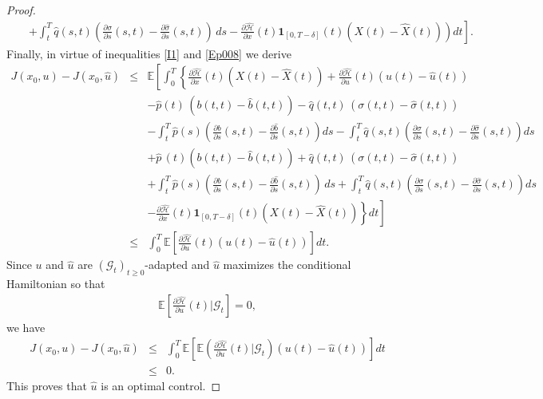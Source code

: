 \documentclass[12pt]{article}
\theoremstyle{remark}
\numberwithin{equation}{section}
\def\E{\mathbb E}
\def\E{\mathbb E}
\begin{document}
\begin{proof}
\begin{eqnarray}
	&&\left.\left.+ \int_t^T \hat{q}(s,t)\left( \frac{\partial \sigma}{\partial s}(s,t)- \frac{\partial \hat{\sigma}}{\partial s}(s,t)\right) \, ds -\frac{\partial \hat{\mathcal{H}}}{\partial x}(t)\mathbf{1}_{[0,T-\delta]}(t) \left(X(t)-\hat{X}(t)\right) 
	\right)dt\right].
\end{eqnarray}
Finally, in virtue of inequalities \eqref{I1} and \eqref{Ep008} we derive
\begin{eqnarray*}
J(x_0,u)-J(x_0,\hat{u}) &\leq &\mathbb{E}\left[\int_0^T\left\{\frac{\partial \hat{\mathcal{H}}}{\partial x}(t) \left(X(t) - \hat{X}(t)\right)+  \frac{\partial \hat{\mathcal{H}}}{\partial u}(t)(u(t) - \hat{u}(t))\right.\right.\\
	&&\left.\left.- \hat{p}(t)\,\left( b(t,t) - \hat{b}(t,t)\right) - \hat{q}(t,t)\,\left( \sigma(t,t) - \hat{\sigma}(t,t)\right)\right.\right.\\
	&&-\left.\left. \int_{t}^{T}\hat{p}(s)\left( \frac{\partial b}{\partial s}(s,t)- \frac{\partial \hat{b}}{\partial s}(s,t)\right) ds  - \int_{t}^{T}\hat{q}(s,t)\left( \frac{\partial \sigma}{\partial s}(s,t)- \frac{\partial \hat{\sigma}}{\partial s}(s,t)\right)ds\right.\right.\\ 
	&& \left.\left.+\hat{p}\,(t)\left(b(t,t)-\hat{b}(t,t)\right)
	+\hat{q}(t,t)\,\left( \sigma(t,t)-\hat{\sigma}(t,t)\right)\right.\right.\\
	&&+\left.\left. \int_t^T \hat{p}(s) \left( \frac{\partial b}{\partial s}(s,t)-\frac{\partial \hat{b}}{\partial s}(s,t)\right) \, ds + \int_t^T \hat{q}(s,t)\left( \frac{\partial \sigma}{\partial s}(s,t)- \frac{\partial \hat{\sigma}}{\partial s}(s,t)\right)ds\right.\right.\\
	&& \left.\left.- \frac{\partial \hat{\mathcal{H}}}{\partial x}(t)\mathbf{1}_{[0,T-\delta]}(t) \left(X(t)-\hat{X}(t)\right) 
	\right\}dt \right]\\
&\leq &\int_0^T \mathbb{E} \left[\frac{\partial \hat{\mathcal{H}}}{\partial u}(t)(u(t) - \hat{u}(t)) \right] dt.
	\end{eqnarray*}
Since $u$ and $\hat{u}$ are $(\mathcal{G}_t)_{t\geq 0}$-adapted and $\hat{u}$ maximizes the conditional Hamiltonian so that 
\begin{eqnarray*}
\mathbb{E}\left[\frac{\partial \hat{\mathcal{H}}}{\partial u}(t)|\mathcal{G}_t\right]=0,
\end{eqnarray*}
we have
\begin{eqnarray*}
J(x_{0},u) - J(x_{0},\hat{u}) &\leq &  \int_0^T \mathbb{E} \left[\E\left(\frac{\partial \hat{\mathcal{H}}}{\partial u}(t)|\mathcal{G}_t\right)(u(t)-\hat{u}(t))\right]dt \\
	&\leq& 0.
\end{eqnarray*}
This proves that $\hat{u}$ is an optimal control.
\end{proof}
\end{document}

